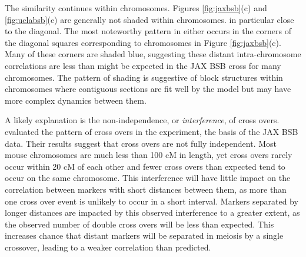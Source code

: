 \documentclass{article}
\begin{document}
The similarity continues within chromosomes. Figures \ref{fig:jaxbsb}(c) and \ref{fig:uclabsb}(c) are generally not shaded within chromosomes. in particular close to the diagonal. The most noteworthy pattern in either occurs in the corners of the diagonal squares corresponding to chromosomes in Figure \ref{fig:jaxbsb}(c). Many of these corners are shaded blue, suggesting these distant intra-chromosome correlations are less than might be expected in the JAX BSB cross for many chromosomes. The pattern of shading is suggestive of block structures within chromosomes where contiguous sections are fit well by the model but may have more complex dynamics between them. 

A likely explanation is the non-independence, or \emph{interference}, of cross overs. \cite{bromanetal2002crossover} evaluated the pattern of cross overs in the \cite{roweetal1994jaxbsb} experiment, the basis of the JAX BSB data. Their results suggest that cross overs are not fully independent. Most mouse chromosomes are much less than 100 cM in length, yet cross overs rarely occur within 20 cM of each other and fewer cross overs than expected tend to occur on the same chromosome. This interference will have little impact on the correlation between markers with short distances between them, as more than one cross over event is unlikely to occur in a short interval. Markers separated by longer distances are impacted by this observed interference to a greater extent, as the observed number of double cross overs will be less than expected. This increases chance that distant markers will be separated in meiosis by a single crossover, leading to a weaker correlation than predicted.
\end{document}
